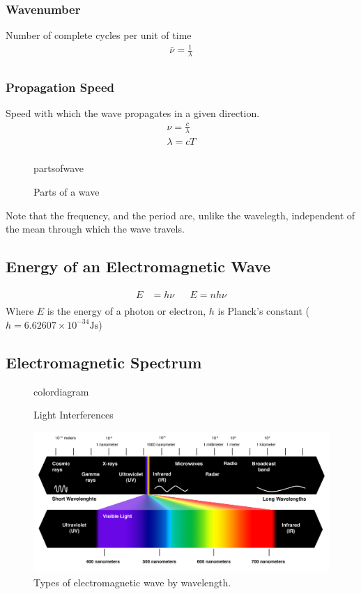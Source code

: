 \documentclass[10pt]{article}
\begin{document}
\subsubsection*{Wavenumber}
Number of complete cycles per unit of time
\begin{align*}
	\bar{\nu} = \frac{1}{\lambda} \\
\end{align*}

\subsubsection*{Propagation Speed}
Speed with which the wave propagates in a given direction.
\begin{align*}
	\nu = \frac{c}{\lambda} \\
	\lambda = cT \\
\end{align*}
\begin{figure}[H]
	\centering
	{partsofwave}
	\caption{Parts of a wave}\label{fig:partsofwave}
\end{figure}
Note that the frequency, and the period are, unlike the wavelegth, independent
of the mean through which the wave travels.
\clearpage
\subsection{Energy of an Electromagnetic Wave}
\begin{align*}
	E & = h\nu &   & E=nh\nu \\
\end{align*}
Where $E$ is the energy of a photon or electron, $h$ is Planck's constant
($h = 6.62607\times 10^{-34}\si{\joule\second}$)

\subsection{Electromagnetic Spectrum}
\begin{figure}[H]
	\centering
	{colordiagram}
	\caption{Light Interferences}\label{fig:colordiagram}
\end{figure}
\begin{figure}[H]
	\centering
	\includegraphics[scale=0.6]{radiations}
	\caption{Types of electromagnetic wave by wavelength.}\label{fig:radiations}
\end{figure}
\clearpage
\end{document}
